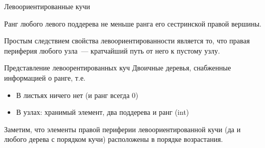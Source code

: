 \begin{frame}[fragile]{Левоориентированные кучи}
\begin{definition}
Ранг любого левого поддерева не меньше ранга его сестринской правой вершины. 
\end{definition}
Простым
следствием свойства левоориентированности является то, что правая
периферия любого узла~--- кратчайший путь от него к пустому узлу.\\


\begin{block}{Представление левоорентированных куч}
Двоичные деревья, снабженные информацией о ранге, т.е.
\begin{itemize}
\item В листьях ничего нет (и ранг всегда 0)
\item В узлах: хранимый элемент, два поддерева и ранг (int)
\end{itemize}
\end{block}

Заметим, что элементы правой периферии левоориентированной кучи (да и
любого дерева с порядком кучи) расположены в порядке возрастания.\\


\end{frame}

